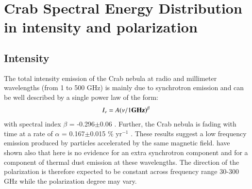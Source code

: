 \documentclass[twocolumn,traditabstract]{aa}
\def\NIKA{\textit{NIKA}}
\def\Planck{\textit{Planck}}
\def\WMAP{\textit{WMAP}}
\begin{document}


\section{Crab Spectral Energy Distribution in intensity and polarization}\label{sec:Polarization intensity Spectral Energy Density (SED)}
\subsection{Intensity}
The total intensity emission of the Crab nebula at radio and millimeter
wavelengths (from 1 to 500 GHz) is mainly due to synchrotron emission and can be
well described by a single power law of the form:
\begin{equation}
I_{\nu} = A(\nu / 1 {\bf GHz})^{\beta}
\end{equation}\label{eq:sync}
with spectral index $\beta$ = -0.296$\pm$0.06 \citep{baars1977absolute,macias2010}. Further, the Crab nebula is fading with time at a rate of $\alpha$ = 0.167$\pm$0.015 \% yr$^{-1}$ \citep{aller1985decrease}. 
These results suggest a low frequency emission produced by particles accelerated by the same magnetic field. \cite{macias2010} have shown also that here is no evidence for an extra synchrotron component and for a component of thermal dust emission at these wavelengths. The direction of the polarization is therefore expected to be constant across frequency range 30-300 GHz while the polarization degree may vary.
\end{document}
